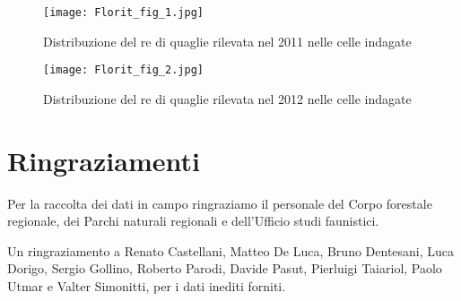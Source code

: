 \begin{figure}[!h]
\centering
\texttt{[image: Florit\_fig\_1.jpg]}
\caption{Distribuzione del re di quaglie rilevata nel 2011 nelle celle indagate}
\label{Florit_fig_1}
\end{figure}

\begin{figure}[!h]
\centering
\texttt{[image: Florit\_fig\_2.jpg]}
\caption{Distribuzione del re di quaglie rilevata nel 2012 nelle celle indagate}
\label{Florit_fig_2}
\end{figure}

\newpage
\section*{Ringraziamenti}
Per la raccolta dei dati in campo ringraziamo il personale del Corpo forestale regionale, dei Parchi naturali regionali e dell{\textquoteright}Ufficio studi faunistici.

Un ringraziamento a Renato Castellani, Matteo De Luca, Bruno Dentesani, Luca Dorigo, Sergio Gollino, Roberto Parodi, Davide Pasut, Pierluigi Taiariol, Paolo Utmar e Valter Simonitti, per i dati inediti forniti. 

